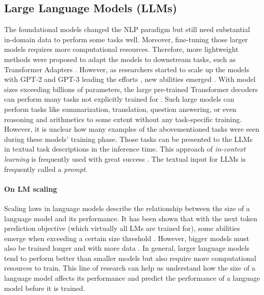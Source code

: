 \subsection{Large Language Models (LLMs)}
The foundational models changed the NLP paradigm but still need substantial in-domain data to perform some tasks well.
Moreover, fine-tuning those larger models requires more computational resources.
Therefore, more lightweight methods were proposed to adapt the models to downstream tasks, such as Transformer Adapters \cite{pfeiffer2020AdapterHub}.
However, as researchers started to scale up the models with GPT-2 and GPT-3 leading the efforts \cite{radford2019language,brown2020language}, new abilities emerged \cite{wei2022emergent}.
With model sizes exceeding billions of parameters, the large pre-trained Transformer decoders can perform many tasks not explicitly trained for \cite{brown2020language}.
Such large models can perform tasks like summarization, translation, question answering, or even reasoning and arithmetics to some extent without any task-specific training.
However, it is unclear how many examples of the abovementioned tasks were seen during these models' training phase.
Those tasks can be presented to the LLMs in textual task descriptions in the inference time.
This approach of \emph{in-context learning} is frequently used with great success \cite{min2022rethinking,dong2022survey}.
The textual input for LLMs is frequently called a \emph{prompt}.

\paragraph{On LM scaling}
Scaling laws in language models describe the relationship between the size of a language model and its performance.
It has been shown that with the next token prediction objective (which virtually all LMs are trained for), some abilities emerge when exceeding a certain size threshold \cite{kaplan2020scaling}.
However, bigger models must also be trained longer and with more data \cite{hoffmann2022training}.
In general, larger language models tend to perform better than smaller models but also require more computational resources to train.
This line of research can help us understand how the size of a language model affects its performance and predict the performance of a language model before it is trained.

